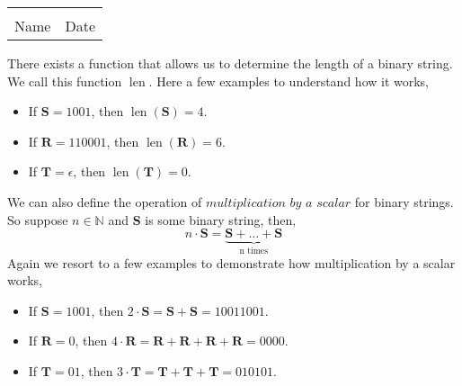\documentclass[12pt]{article} %
\begin{document}
	\begin{center}
	\noindent\begin{tabular}{ll}
		\makebox[3in]{\hrulefill} & \makebox[3in]{\hrulefill}\\
		Name & Date\\[8ex]%
	\end{tabular}
	\end{center}
	\newpage



\begin{qstn}
  There exists a function that allows us to determine the length of a binary string.\\We call
  this function $\operatorname{len}$. Here a few examples to understand how it works,
  \begin{itemize}
    \item If $\textbf{S} = 1001$, then $\operatorname{len}(\textbf{S}) = 4$.
    \item If $\textbf{R} = 110001$, then $\operatorname{len}(\textbf{R}) = 6$.
    \item If $\textbf{T} = \epsilon$, then $\operatorname{len}(\textbf{T}) = 0$.
  \end{itemize}

  We can also define the operation of $ \textit{multiplication by a scalar}$ for binary strings. So suppose $n \in
  \mathbb N$ and \textbf{S} is some binary string, then,
    \[
      n\cdot \textbf{S} = \underbrace{\textbf{S} + \dots + \textbf{S}}_{\text{n times}}
    \]
  Again we resort to a few examples to demonstrate how multiplication by a scalar works,
  \begin{itemize}
    \item If $\textbf{S} = 1001$,  then $2\cdot\textbf{S} = \textbf{S} + \textbf{S} = 10011001$.
    \item If $\textbf{R} = 0$,  then $4\cdot\textbf{R} = \textbf{R} + \textbf{R} + \textbf{R} + \textbf{R} = 0000$.
    \item If $\textbf{T} = 01$,  then $3\cdot\textbf{T} = \textbf{T} + \textbf{T} + \textbf{T} = 010101$.
  \end{itemize}
  

\end{qstn}
\end{document}
